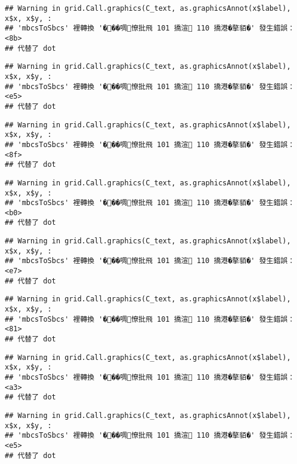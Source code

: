\documentclass[
]{article}
\begin{document}
\begin{verbatim}
## Warning in grid.Call.graphics(C_text, as.graphicsAnnot(x$label), x$x, x$y, :
## 'mbcsToSbcs' 裡轉換 '���啁憭批飛 101 撟渲 110 撟港�摮貊�' 發生錯誤：<8b>
## 代替了 dot
\end{verbatim}

\begin{verbatim}
## Warning in grid.Call.graphics(C_text, as.graphicsAnnot(x$label), x$x, x$y, :
## 'mbcsToSbcs' 裡轉換 '���啁憭批飛 101 撟渲 110 撟港�摮貊�' 發生錯誤：<e5>
## 代替了 dot
\end{verbatim}

\begin{verbatim}
## Warning in grid.Call.graphics(C_text, as.graphicsAnnot(x$label), x$x, x$y, :
## 'mbcsToSbcs' 裡轉換 '���啁憭批飛 101 撟渲 110 撟港�摮貊�' 發生錯誤：<8f>
## 代替了 dot
\end{verbatim}

\begin{verbatim}
## Warning in grid.Call.graphics(C_text, as.graphicsAnnot(x$label), x$x, x$y, :
## 'mbcsToSbcs' 裡轉換 '���啁憭批飛 101 撟渲 110 撟港�摮貊�' 發生錯誤：<b0>
## 代替了 dot
\end{verbatim}

\begin{verbatim}
## Warning in grid.Call.graphics(C_text, as.graphicsAnnot(x$label), x$x, x$y, :
## 'mbcsToSbcs' 裡轉換 '���啁憭批飛 101 撟渲 110 撟港�摮貊�' 發生錯誤：<e7>
## 代替了 dot
\end{verbatim}

\begin{verbatim}
## Warning in grid.Call.graphics(C_text, as.graphicsAnnot(x$label), x$x, x$y, :
## 'mbcsToSbcs' 裡轉換 '���啁憭批飛 101 撟渲 110 撟港�摮貊�' 發生錯誤：<81>
## 代替了 dot
\end{verbatim}

\begin{verbatim}
## Warning in grid.Call.graphics(C_text, as.graphicsAnnot(x$label), x$x, x$y, :
## 'mbcsToSbcs' 裡轉換 '���啁憭批飛 101 撟渲 110 撟港�摮貊�' 發生錯誤：<a3>
## 代替了 dot
\end{verbatim}

\begin{verbatim}
## Warning in grid.Call.graphics(C_text, as.graphicsAnnot(x$label), x$x, x$y, :
## 'mbcsToSbcs' 裡轉換 '���啁憭批飛 101 撟渲 110 撟港�摮貊�' 發生錯誤：<e5>
## 代替了 dot
\end{verbatim}
\end{document}
